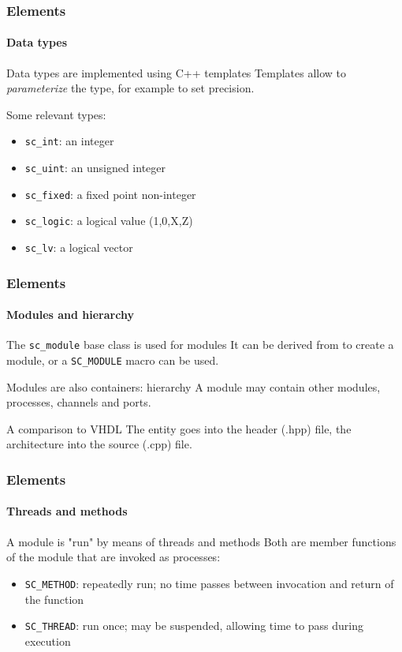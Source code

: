 \begin{frame}
\frametitle{Elements}
\framesubtitle{Data types}

\begin{block}{Data types are implemented using C++ templates}
Templates allow to {\em parameterize} the type, for example to set precision.
\end{block}
\pause
\begin{block}{Some relevant types:}
\begin{itemize}
\item \texttt{sc\_int}: an integer
\item \texttt{sc\_uint}: an unsigned integer
\item \texttt{sc\_fixed}: a fixed point non-integer
\item \texttt{sc\_logic}: a logical value (1,0,X,Z)
\item \texttt{sc\_lv}: a logical vector
\end{itemize}
\end{block}

\end{frame}


\begin{frame}
\frametitle{Elements}
\framesubtitle{Modules and hierarchy}

\begin{block}{The \texttt{sc\_module} base class is used for modules}
It can be derived from to create a module, or a \texttt{SC\_MODULE} macro can be used.
\end{block}
\pause
\begin{block}{Modules are also containers: hierarchy}
A module may contain other modules, processes, channels and ports.
\end{block}
\pause
\begin{block}{A comparison to VHDL}
The entity goes into the header (.hpp) file, the architecture into the source (.cpp) file.
\end{block}

\end{frame}

\begin{frame}
\frametitle{Elements}
\framesubtitle{Threads and methods}

\begin{block}{A module is "run" by means of threads and methods}
Both are member functions of the module that are invoked as processes:
\begin{itemize}
\item \texttt{SC\_METHOD}: repeatedly run; no time passes between invocation and return of the function
\item \texttt{SC\_THREAD}: run once; may be suspended, allowing time to pass during execution
\end{itemize}
\end{block}

\end{frame}

